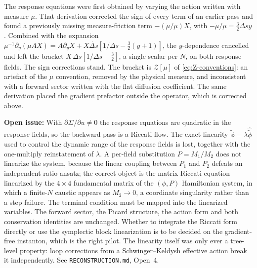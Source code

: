\documentclass[a4paper,11pt]{article}
\newcommand{\semibold}[1]{{\fontseries{b}\selectfont{#1}}}
\newenvironment{panel}{\begin{tcolorbox}[enhanced,breakable,colback=gray!10,colframe=gray!30]\small}{\end{tcolorbox}}
\newenvironment{todo}{\begin{tcolorbox}[enhanced,breakable,colback=SussexBurntOrange!10,colframe=SussexBurntOrange!40]\small{\textsf{\textbf{Open issue:} }}}{\end{tcolorbox}}
\newcommand{\Ny}{N}                          %
\newcommand{\field}{\phi}                    %
\newcommand{\rfield}{\widetilde\field}       %
\newcommand{\yco}{y}                         %
\newcommand{\Deltas}{\Delta s}                %
\newcommand{\measure}{\mu}                   %
\newcommand{\advcoef}{A}                     %
\newcommand{\Sigvol}[1]{\varSigma_{#1}}      %
\newcommand{\lag}{\lambda}                   %
\begin{document}
\begin{panel}
\semibold{Historical: the direct re-derivation of 6 July 2026.} The
response equations were first obtained by varying the action written with
measure $\measure$. That derivation corrected the sign of every term of
an earlier pass and found a previously missing measure-friction term
$-(\dot\measure/\measure)X$, with $-\dot\measure/\measure=\tfrac32\dot{\Deltas}\yco$.
Combined with the expansion
$\measure^{-1}\partial_\yco(\measure\advcoef X)=\advcoef\partial_\yco X+X\dot{\Deltas}[1/\Deltas-\tfrac32(\yco+1)]$,
the $\yco$-dependence cancelled and left the bracket
$X\,\dot{\Deltas}[1/\Deltas-\tfrac32]$, a single scalar per $\Ny$, on both
response fields. The sign corrections stand. The bracket is
$\mathcal{Z}[\measure]$ of \eqref{eq:Z-conventions}: an artefact of the
$\measure$ convention, removed by the physical measure, and inconsistent
with a forward sector written with the flat diffusion coefficient. The
same derivation placed the gradient prefactor outside the operator, which
is corrected above.
\end{panel}

\begin{todo}
\semibold{Riccati structure of the response sector.} With
$\partial\Sigvol{}/\partial u\neq0$ the response equations are quadratic in
the response fields, so the backward pass is a Riccati flow. The exact
linearity $\rfield=\lag\hat{\rfield}$ used to control the dynamic range of
the response fields is lost, together with the one-multiply reinstatement
of $\lag$. A per-field substitution $P=M_1/M_2$ does not linearize the
system, because the linear coupling between $P_1$ and $P_2$ defeats an
independent ratio ansatz; the correct object is the matrix Riccati
equation linearized by the $4\times4$ fundamental matrix of the
$(\field,P)$ Hamiltonian system, in which a finite-$\Ny$ caustic appears
as $M_2\to0$, a coordinate singularity rather than a step failure. The
terminal condition must be mapped into the linearized variables. The
forward sector, the Picard structure, the action form and both
conservation identities are unchanged. Whether to integrate the Riccati
form directly or use the symplectic block linearization is to be decided
on the gradient-free instanton, which is the right pilot. The linearity
itself was only ever a tree-level property: loop corrections from a
Schwinger--Keldysh effective action break it independently. See
\texttt{RECONSTRUCTION.md}, Open~4.
\end{todo}
\end{document}
